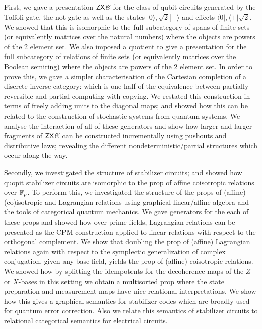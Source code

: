\documentclass[12pt]{ociamthesis}  %
\begin{document}
First, we gave a presentation $\mathsf{ZX}\textit{\&}$ for the  class of qubit circuits generated by the Toffoli gate, the not gate as well as the states $|0\rangle, \sqrt 2 |+\rangle$ and effects $\langle 0 |, \langle +|\sqrt{2}$.  We showed that this is isomorphic to the full subcategory of spans of finite sets (or equivalently matrices over the natural numbers) where the objects are powers of the 2 element set.  We also imposed a quotient to give a presentation for the full subcategory of relations of finite sets (or equivalently matrices over the Boolean semiring) where the objects are powers of the 2 element set.  In order to prove this, we gave a simpler characterisation of the Cartesian completion of a discrete inverse category: which is one half of the equivalence between partially reversible and partial computing with copying.  We restated this construction in terms of freely adding units to the diagonal maps; and showed how this can be related to the construction of stochastic systems from quantum systems.  We analyse the interaction of all of these generators and show how larger and larger fragments of $\mathsf{ZX}\textit{\&}$ can be constructed incrementally using pushouts and distributive laws; revealing the different nondeterministic/partial structures which occur along the way.


Secondly, we investigated the structure of stabilizer circuits; and showed how quopit stabilizer circuits are isomorphic to the prop of affine coisotropic relations over $\mathbb{F}_p$.  To perform this, we investigated the structure of the props of (affine) (co)isotropic and Lagrangian relations using graphical linear/affine algebra and the tools of categorical quantum mechanics.  We gave generators for the each of these props and showed how over prime fields, Lagrangian relations can be presented as the CPM construction applied to linear relations with respect to the orthogonal complement.  We show that doubling the prop of (affine) Lagrangian relations again with respect to the symplectic generalization of complex conjugation, given any base field, yields the prop of (affine) coisotropic relations.  We showed how by splitting the idempotents for the decoherence maps of the $Z$ or $X$-bases in this setting we obtain a multisorted prop where the state preparation and measurement maps have nice relational interpretations.  We show how this gives a graphical semantics for stabilizer codes which are broadly used for quantum error correction.  Also we relate this semantics of stabilizer circuits to relational categorical semantics for electrical circuits.
\end{document}
